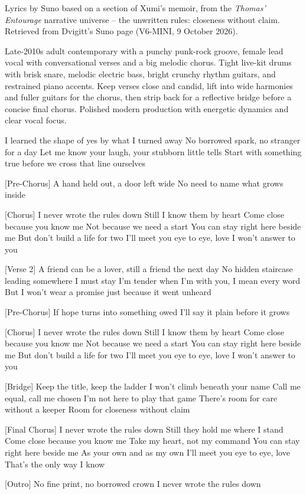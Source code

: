 \begin{notes}
Lyrics by Suno based on a section of Xumi's memoir, from the \emph{Thomas' Entourage} narrative universe -- the unwritten rules: closeness without claim. Retrieved from Dvigitt's Suno page (V6-MINI, 9 October 2026).
\end{notes}
\begin{style}
Late-2010s adult contemporary with a punchy punk-rock groove, female lead vocal with conversational verses and a big melodic chorus. Tight live-kit drums with brisk snare, melodic electric bass, bright crunchy rhythm guitars, and restrained piano accents. Keep verses close and candid, lift into wide harmonies and fuller guitars for the chorus, then strip back for a reflective bridge before a concise final chorus. Polished modern production with energetic dynamics and clear vocal focus.
\end{style}
\begin{lyrics}
[Verse 1]
I learned the shape of yes by what I turned away
No borrowed spark, no stranger for a day
Let me know your laugh, your stubborn little tells
Start with something true before we cross that line ourselves

[Pre-Chorus]
A hand held out, a door left wide
No need to name what grows inside

[Chorus]
I never wrote the rules down
Still I know them by heart
Come close because you know me
Not because we need a start
You can stay right here beside me
But don’t build a life for two
I’ll meet you eye to eye, love
I won’t answer to you

[Verse 2]
A friend can be a lover, still a friend the next day
No hidden staircase leading somewhere I must stay
I’m tender when I’m with you, I mean every word
But I won’t wear a promise just because it went unheard

[Pre-Chorus]
If hope turns into something owed
I’ll say it plain before it grows

[Chorus]
I never wrote the rules down
Still I know them by heart
Come close because you know me
Not because we need a start
You can stay right here beside me
But don’t build a life for two
I’ll meet you eye to eye, love
I won’t answer to you

[Bridge]
Keep the title, keep the ladder
I won’t climb beneath your name
Call me equal, call me chosen
I’m not here to play that game
There’s room for care without a keeper
Room for closeness without claim

[Final Chorus]
I never wrote the rules down
Still they hold me where I stand
Come close because you know me
Take my heart, not my command
You can stay right here beside me
As your own and as my own
I’ll meet you eye to eye, love
That’s the only way I know

[Outro]
No fine print, no borrowed crown
I never wrote the rules down
\end{lyrics}

